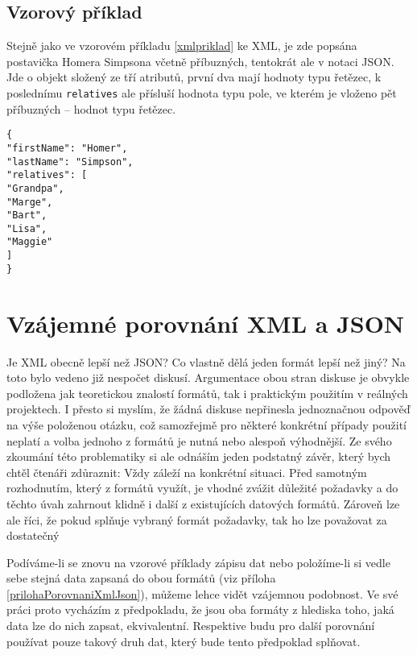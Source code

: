\subsection{Vzorový příklad}
Stejně jako ve vzorovém příkladu \ref{xmlpriklad} ke XML, je zde popsána postavička Homera Simpsona včetně příbuzných, tentokrát ale v notaci JSON. Jde o objekt složený ze tří atributů, první dva mají hodnoty typu řetězec, k poslednímu \texttt{relatives} ale přísluší hodnota typu pole, ve kterém je vloženo pět příbuzných -- hodnot typu řetězec.

\texttt{\small\{\\
\hspace*{2mm}"firstName": "Homer",\\
\hspace*{2mm}"lastName": "Simpson",\\
\hspace*{2mm}"relatives": [\\
\hspace*{4mm}"Grandpa",\\
\hspace*{4mm}"Marge",\\
\hspace*{4mm}"Bart",\\
\hspace*{4mm}"Lisa",\\
\hspace*{4mm}"Maggie"\\
\hspace*{2mm}]\\
\} }

\section{Vzájemné porovnání XML a JSON}


Je XML obecně lepší než JSON? Co vlastně dělá jeden formát lepší než jiný? Na toto bylo vedeno již nespočet diskusí. Argumentace obou stran diskuse je obvykle podložena jak teoretickou znalostí formátů, tak i praktickým použitím v reálných projektech. I přesto si myslím, že žádná diskuse nepřinesla jednoznačnou odpověď na výše položenou otázku, což samozřejmě pro některé konkrétní případy použití neplatí a volba jednoho z formátů je nutná nebo alespoň výhodnější. Ze svého zkoumání této problematiky si ale odnáším jeden podstatný závěr, který bych chtěl čtenáři zdůraznit: Vždy záleží na konkrétní situaci. Před samotným rozhodnutím, který z formátů využít, je vhodné zvážit důležité požadavky a do těchto úvah zahrnout klidně i další z existujících datových formátů. Zároveň lze ale říci, že pokud splňuje vybraný formát požadavky, tak ho lze považovat za dostatečný 

Podíváme-li se znovu na vzorové příklady zápisu dat nebo položíme-li si vedle sebe stejná data zapsaná do obou formátů (viz příloha \ref{prilohaPorovnaniXmlJson}), můžeme lehce vidět vzájemnou podobnost. Ve své práci proto vycházím z předpokladu, že jsou oba formáty z hlediska toho, jaká data lze do nich zapsat, ekvivalentní. Respektive budu pro další porovnání používat pouze takový druh dat, který bude tento předpoklad splňovat.